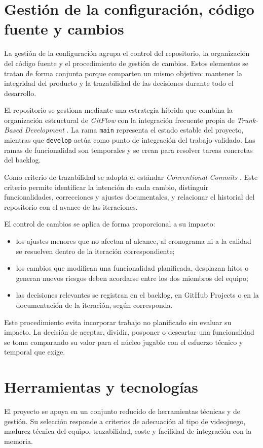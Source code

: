 \section{Gestión de la configuración, código fuente y cambios}
La gestión de la configuración agrupa el control del repositorio, la organización del código
fuente y el procedimiento de gestión de cambios. Estos elementos se tratan de forma conjunta
porque comparten un mismo objetivo: mantener la integridad del producto y la trazabilidad de
las decisiones durante todo el desarrollo.

El repositorio se gestiona mediante una estrategia híbrida que combina la organización
estructural de \textit{GitFlow} \cite{driessen2010gitflow} con la integración frecuente
propia de \textit{Trunk-Based Development} \cite{trunkbasedIntro}. La rama \texttt{main}
representa el estado estable del proyecto, mientras que \texttt{develop} actúa como punto de
integración del trabajo validado. Las ramas de funcionalidad son temporales y se crean para
resolver tareas concretas del backlog.

Como criterio de trazabilidad se adopta el estándar \textit{Conventional Commits}
\cite{conventionalCommits10}. Este criterio permite identificar la intención de cada cambio,
distinguir funcionalidades, correcciones y ajustes documentales, y relacionar el historial
del repositorio con el avance de las iteraciones.

El control de cambios se aplica de forma proporcional a su impacto:

\begin{itemize}
    \item los ajustes menores que no afectan al alcance, al cronograma ni a la calidad se
    resuelven dentro de la iteración correspondiente;
    \item los cambios que modifican una funcionalidad planificada, desplazan hitos o generan
    nuevos riesgos deben acordarse entre los dos miembros del equipo;
    \item las decisiones relevantes se registran en el backlog, en GitHub Projects o en la
    documentación de la iteración, según corresponda.
\end{itemize}

Este procedimiento evita incorporar trabajo no planificado sin evaluar su impacto. La
decisión de aceptar, dividir, posponer o descartar una funcionalidad se toma comparando su
valor para el núcleo jugable con el esfuerzo técnico y temporal que exige.

\section{Herramientas y tecnologías}
El proyecto se apoya en un conjunto reducido de herramientas técnicas y de gestión. Su
selección responde a criterios de adecuación al tipo de videojuego, madurez técnica del
equipo, trazabilidad, coste y facilidad de integración con la memoria.


